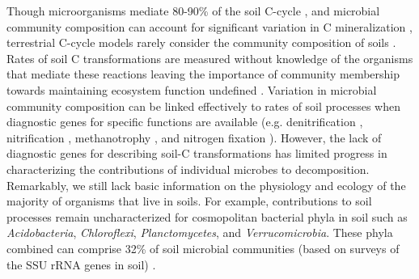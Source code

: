 Though microorganisms mediate 80-90\% of the soil C-cycle
\citep{ColemanCrossley_1996,Nannipieri_2003}, and microbial community
composition can account for significant variation in C mineralization
\citep{Strickland_2009}, terrestrial C-cycle models rarely consider the
community composition of soils \citep{Zak2006,Reed2007}. Rates of soil
C transformations are measured without knowledge of the organisms that mediate
these reactions \citep{Nannipieri_2003} leaving the importance of community
membership towards maintaining ecosystem function undefined
\citep{Nannipieri_2003,Schimel_2012,Allison_2008}. Variation in microbial
community composition can be linked effectively to rates of soil processes when
diagnostic genes for specific functions are available (e.g. denitrification
\citep{Cavigelli2000}, nitrification \citep{Carney2004,Hawkes2005,Webster2005},
methanotrophy \citep{Gulledge1997}, and nitrogen fixation \citep{Hsu2009}).
However, the lack of diagnostic genes for describing soil-C transformations has
limited progress in characterizing the contributions of individual microbes to
decomposition. Remarkably, we still lack basic information on the physiology
and ecology of the majority of organisms that live in soils. For example,
contributions to soil processes remain uncharacterized for 
cosmopolitan bacterial phyla in soil such as \textit{Acidobacteria},
\textit{Chloroflexi}, \textit{Planctomycetes}, and \textit{Verrucomicrobia}.
These phyla combined can comprise 32\% of soil microbial communities (based on
surveys of the SSU rRNA genes in soil) \citep{Janssen2006,Buckley2002}. 

